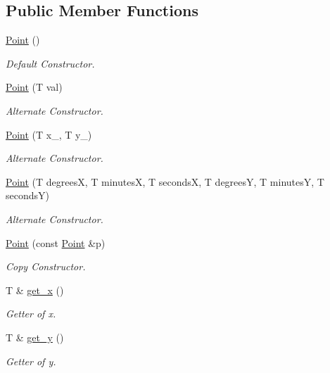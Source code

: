 \subsection*{Public Member Functions}
\begin{DoxyCompactItemize}
\item 
\hyperlink{classutil_1_1Point_a805a2536f7312ac891a4c729174c1514}{Point} ()
\begin{DoxyCompactList}\small\item\em Default Constructor. \end{DoxyCompactList}\item 
\hyperlink{classutil_1_1Point_a3729f87defc02c0c428f99ffdadb1385}{Point} (T val)
\begin{DoxyCompactList}\small\item\em Alternate Constructor. \end{DoxyCompactList}\item 
\hyperlink{classutil_1_1Point_a7198b421e0d0bbca0672e940565af36a}{Point} (T x\+\_\+, T y\+\_\+)
\begin{DoxyCompactList}\small\item\em Alternate Constructor. \end{DoxyCompactList}\item 
\hyperlink{classutil_1_1Point_ab79142480eae4e5730eb72bace4234fe}{Point} (T degreesX, T minutesX, T secondsX, T degreesY, T minutesY, T secondsY)
\begin{DoxyCompactList}\small\item\em Alternate Constructor. \end{DoxyCompactList}\item 
\hyperlink{classutil_1_1Point_ae5dfbf640a1b751fad85a71f8f768384}{Point} (const \hyperlink{classutil_1_1Point}{Point} \&p)
\begin{DoxyCompactList}\small\item\em Copy Constructor. \end{DoxyCompactList}\item 
T \& \hyperlink{classutil_1_1Point_ab5a39259be6edc0a30e2a92bb4b7e526}{get\+\_\+x} ()
\begin{DoxyCompactList}\small\item\em Getter of x. \end{DoxyCompactList}\item 
T \& \hyperlink{classutil_1_1Point_aaf8b4a81f8cb3b841efac6009e849545}{get\+\_\+y} ()
\begin{DoxyCompactList}\small\item\em Getter of y. \end{DoxyCompactList}\item 

\end{DoxyCompactItemize}
